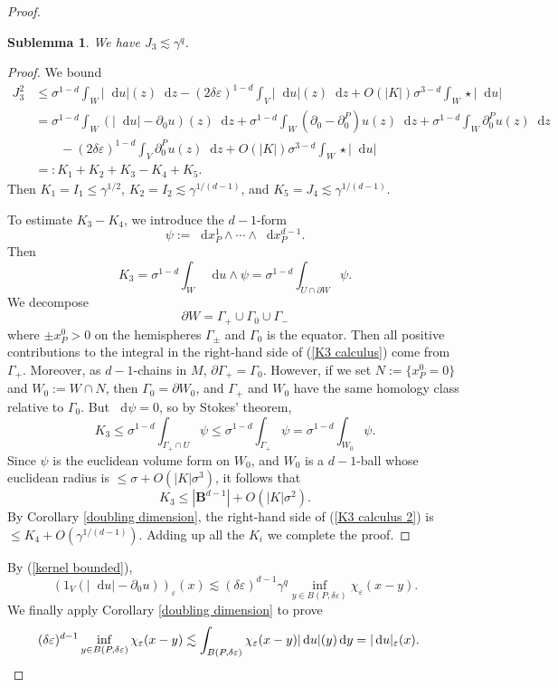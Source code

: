\documentclass[final,12pt, leqno]{brownthesis}
\newcommand{\Ball}{\mathbf{B}}
\newcommand*\dif{\mathop{}\!\mathrm{d}}
\newtheorem{sublemma}[theorem]{Sublemma}
\theoremstyle{definition}
\numberwithin{equation}{section}
\begin{document}
\begin{proof}
\begin{sublemma}
    We have $J_3 \lesssim \gamma^q$.
\end{sublemma}
\begin{proof}
We bound
\begin{align*}
J_3^2 &\leq \sigma^{1 - d} \int_W |\dif u|(z) \dif z - (2 \delta \varepsilon)^{1 - d} \int_V |\dif u|(z) \dif z + O(|K|) \sigma^{3 - d} \int_W \star |\dif u| \\
&= \sigma^{1 - d} \int_W (|\dif u| - \partial_0 u)(z) \dif z + \sigma^{1 - d} \int_W (\partial_0 - \partial_0^P)u(z) \dif z + \sigma^{1 - d} \int_W \partial_0^Pu(z) \dif z \\
  &\qquad - (2 \delta\varepsilon)^{1 - d} \int_V \partial_0^P u(z) \dif z + O(|K|) \sigma^{3 - d} \int_W \star |\dif u| \\
&=: K_1 + K_2 + K_3 - K_4 + K_5.
\end{align*}
Then $K_1 = I_1 \leq \gamma^{1/2}$, $K_2 = I_2 \lesssim \gamma^{1/(d - 1)}$, and $K_5 = J_4 \lesssim \gamma^{1/(d - 1)}$.

To estimate $K_3 - K_4$, we introduce the $d - 1$-form
$$\psi := \dif x^1_P \wedge \cdots \wedge \dif x^{d - 1}_P.$$
Then
\begin{equation}\label{K3 calculus}
K_3 = \sigma^{1 - d} \int_W \dif u \wedge \psi = \sigma^{1 - d} \int_{U \cap \partial W} \psi.
\end{equation}
We decompose
$$\partial W = \Gamma_+ \cup \Gamma_0 \cup \Gamma_-$$
where $\pm x^0_P > 0$ on the hemispheres $\Gamma_\pm$ and $\Gamma_0$ is the equator.
Then all positive contributions to the integral in the right-hand side of (\ref{K3 calculus}) come from $\Gamma_+$.
Moreover, as $d-1$-chains in $M$, $\partial \Gamma_+ = \Gamma_0$.
However, if we set $N := \{x^0_P = 0\}$ and $W_0 := W \cap N$, then $\Gamma_0 = \partial W_0$, and $\Gamma_+$ and $W_0$ have the same homology class relative to $\Gamma_0$.
But $\dif \psi = 0$, so by Stokes' theorem,
$$K_3 \leq \sigma^{1 - d} \int_{\Gamma_+ \cap U} \psi \leq \sigma^{1 - d} \int_{\Gamma_+} \psi = \sigma^{1 - d} \int_{W_0} \psi.$$
Since $\psi$ is the euclidean volume form on $W_0$, and $W_0$ is a $d-1$-ball whose euclidean radius is $\leq \sigma + O(|K| \sigma^3)$, it follows that
\begin{equation}\label{K3 calculus 2}
K_3 \leq |\Ball^{d - 1}| + O(|K| \sigma^2).
\end{equation}
By Corollary \ref{doubling dimension}, the right-hand side of (\ref{K3 calculus 2}) is $\leq K_4 + O(\gamma^{1/(d - 1)})$.
Adding up all the $K_i$ we complete the proof.
\end{proof}

By (\ref{kernel bounded}),
$$(1_V(|\dif u| - \partial_0 u))_\varepsilon(x) \lesssim (\delta\varepsilon)^{d - 1} \gamma^q \inf_{y \in B(P, \delta\varepsilon)} \chi_\varepsilon(x - y).$$
We finally apply Corollary \ref{doubling dimension} to prove
\begin{align*}
(\delta\varepsilon)^{d - 1} \inf_{y \in B(P, \delta\varepsilon)} \chi_\varepsilon(x - y)
&\lesssim \int_{B(P, \delta \varepsilon)} \chi_\varepsilon(x - y) |\dif u|(y) \dif y = |\dif u|_\varepsilon(x). \qedhere
\end{align*}
\end{proof}
\end{document}
